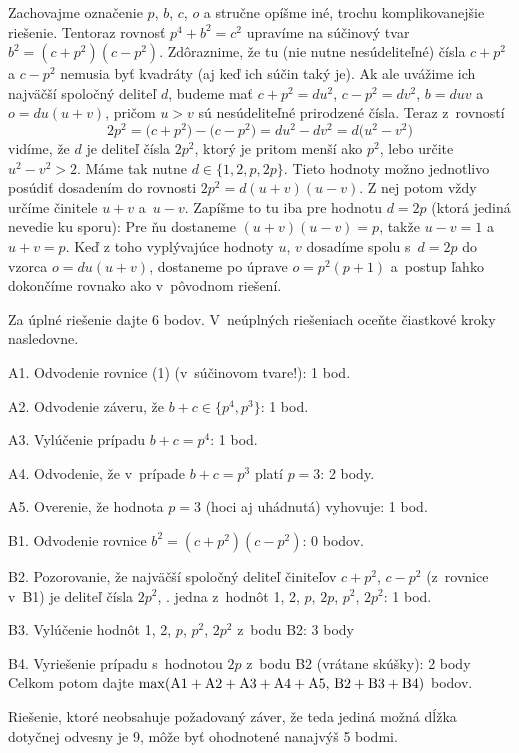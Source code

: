 {\poznamka
Zachovajme označenie $p$, $b$, $c$, $o$ a stručne opíšme iné,
trochu komplikovanejšie riešenie. Tentoraz rovnosť $p^4+b^2=c^2$
upravíme na súčinový tvar $b^2=(c+p^2)(c-p^2)$.
Zdôraznime, že tu (nie nutne nesúdeliteľné) čísla $c+p^2$ a $c-p^2$
nemusia byť kvadráty (aj keď ich súčin taký je).
Ak ale uvážime ich najväčší spoločný deliteľ $d$, budeme mať
$c+p^2=du^2$, $c-p^2=dv^2$, $b=duv$ a $o=du(u+v)$,
pričom $u>v$ sú nesúdeliteľné prirodzené čísla. Teraz z~rovností
$$
2p^2=\bigl(c+p^2\bigr)-\bigl(c-p^2\bigr)=du^2-dv^2=d\bigl(u^2-v^2\bigr)
$$
vidíme, že $d$ je deliteľ čísla $2p^2$, ktorý je pritom menší ako
$p^2$, lebo určite $u^2-v^2>2$. Máme tak nutne $d\in\{1,2,p,2p\}$.
Tieto hodnoty možno jednotlivo posúdiť dosadením
do rovnosti $2p^2={d(u+v)(u-v)}$. Z nej potom vždy určíme
činitele $u+v$ a~${u-v}$. Zapíšme to tu iba
pre hodnotu $d=2p$ (ktorá jediná nevedie ku sporu):
Pre ňu dostaneme ${(u+v)(u-v)}=p$,
takže $u-v=1$ a $u+v=p$. Keď z toho vyplývajúce hodnoty $u$, $v$
dosadíme spolu s~$d=2p$ do vzorca $o=du(u+v)$,
dostaneme po úprave $o=p^2(p+1)$ a~postup ľahko dokončíme
rovnako ako v~pôvodnom riešení.

\schemaABC
Za úplné riešenie dajte 6 bodov. V~neúplných riešeniach oceňte čiastkové kroky nasledovne.
\item{A1.} Odvodenie rovnice (1) (v~súčinovom tvare!): 1 bod.
\item{A2.} Odvodenie záveru, že $b+c\in\{p^4,p^3\}$: 1 bod.
\item{A3.} Vylúčenie prípadu $b+c=p^4$: 1 bod.
\item{A4.} Odvodenie, že v~prípade $b+c=p^3$ platí $p=3$: 2 body.
\item{A5.} Overenie, že hodnota $p=3$ (hoci aj uhádnutá) vyhovuje: 1 bod.
\item{B1.} Odvodenie rovnice $b^2=(c+p^2)(c-p^2)$: 0 bodov.
\item{B2.} Pozorovanie, že najväčší spoločný deliteľ činiteľov $c+p^2$, $c-p^2$ (z~rovnice v~B1) je deliteľ čísla $2p^2$, \tj. jedna z~hodnôt 1, 2, $p$, $2p$, $p^2$, $2p^2$: 1 bod.
\item{B3.} Vylúčenie hodnôt 1, 2, $p$, $p^2$, $2p^2$ z~bodu B2: 3 body
\item{B4.} Vyriešenie prípadu s~hodnotou $2p$ z~bodu B2 (vrátane skúšky): 2 body
\endgraf\noindent
Celkom potom dajte $\rm\max(A1+A2+A3+A4+A5,\,B2+B3+B4)$ bodov.

Riešenie, ktoré neobsahuje požadovaný záver, že teda jediná možná dĺžka dotyčnej odvesny je 9, môže byť ohodnotené nanajvýš 5 bodmi.
\endschema
}

